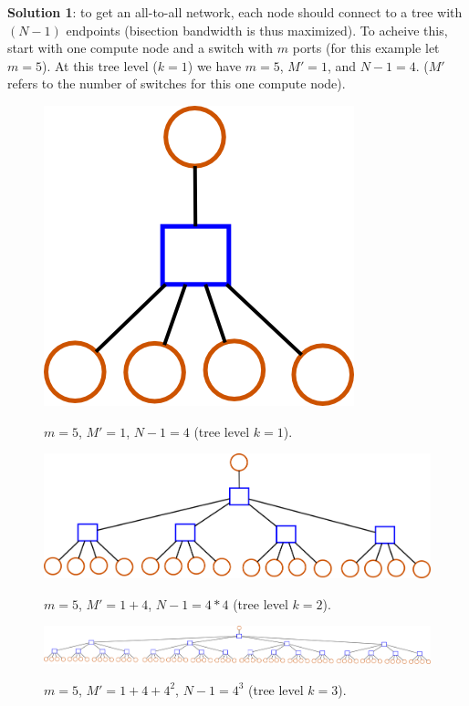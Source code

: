 \documentclass[pdftex]{article}
\begin{document}
\textbf{Solution 1}: to get an all-to-all network, each node should connect to a tree with $(N-1)$ endpoints (bisection bandwidth is thus maximized). To acheive this, start with one compute node and a switch with $m$ ports (for this example let $m=5$). At this tree level ($k=1$) we have $m=5$, $M'=1$, and $N-1=4$. ($M'$ refers to the number of switches for this one compute node).

\begin{figure}[h!]
\begin{center}
\includegraphics[scale=0.3]{pictures/N5_n1_M1_m5_tree}
\label{fig:tree_k1}
 \caption{$m=5$, $M'=1$, $N-1=4$ (tree level $k=1$). }
\end{center}
\end{figure}

\begin{figure}[h!]
\begin{center}
\includegraphics[scale=0.3]{pictures/N17_n1_M5_m5_tree}
\label{fig:tree_k2}
 \caption{$m=5$, $M'=1+4$, $N-1=4*4$ (tree level $k=2$). }
\end{center}
\end{figure}


\begin{figure}[h!]
\begin{center}
\includegraphics[scale=0.3]{pictures/N65_n1_M21_m5_tree}
\label{fig:tree_k3}
 \caption{$m=5$, $M'=1+4+4^2$, $N-1=4^3$ (tree level $k=3$). }
\end{center}
\end{figure}
\end{document}
